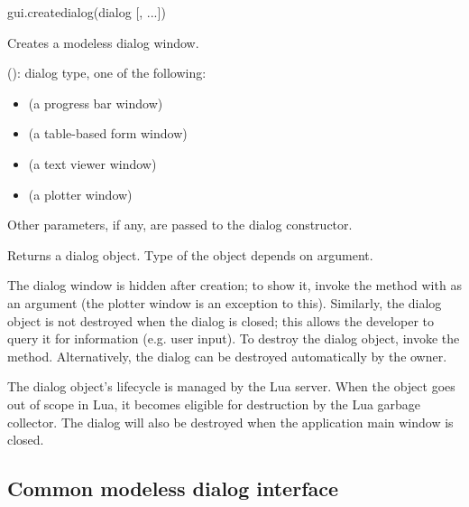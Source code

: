 \documentclass[a4paper,12pt,twoside,extrafontsizes]{memoir}
\begin{document}

\begin{luafuncprototype}
gui.createdialog(dialog [, ...])
\end{luafuncprototype}

\begin{funcdescr}
	Creates a modeless dialog window.
\end{funcdescr}

\begin{funcparams}
	 (): dialog type, one of the following:
	\begin{itemize}
		\item {} (a progress bar window)
		\item {} (a table-based form window)
		\item {} (a text viewer window)
		\item {} (a plotter window)
	\end{itemize}
	\item Other parameters, if any, are passed to the dialog constructor.
\end{funcparams}

\begin{funcret}
	Returns a dialog object. Type of the object depends on  argument.
\end{funcret}

\begin{funcremarks}
	The dialog window is hidden after creation; to show it, invoke the  method with  as an argument (the plotter window is an exception to this). Similarly, the dialog object is not destroyed when the dialog is closed; this allows the developer to query it for information (e.g. user input). To destroy the dialog object, invoke the  method. Alternatively, the dialog can be destroyed automatically by the owner.
	
	The dialog object's lifecycle is managed by the Lua server. When the object goes out of scope in Lua, it becomes eligible for destruction by the Lua garbage collector. The dialog will also be destroyed when the application main window is closed.
\end{funcremarks}

\subsection{Common modeless dialog interface}
\label{subsec:luamodelessdialog}
\end{document}
